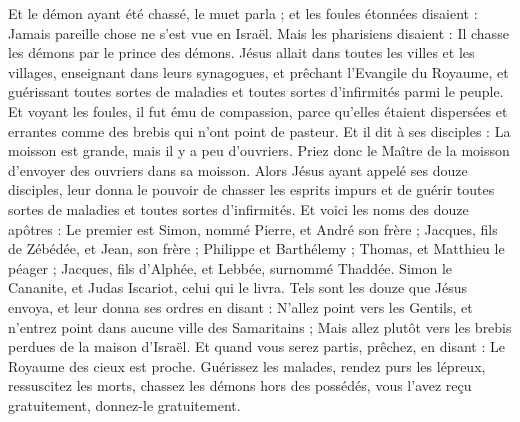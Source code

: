 \begin{multicols}{2}
Et le démon ayant été chassé, le muet parla ; et les foules étonnées disaient : Jamais pareille chose ne s’est vue en Israël.
Mais les pharisiens disaient : Il chasse les démons par le prince des démons.
Jésus allait dans toutes les villes et les villages, enseignant dans leurs synagogues, et prêchant l'Evangile du Royaume, et guérissant toutes sortes de maladies et toutes sortes d'infirmités parmi le peuple.
Et voyant les foules, il fut ému de compassion, parce qu'elles étaient dispersées et errantes comme des brebis qui n'ont point de pasteur.
Et il dit à ses disciples : La moisson est grande, mais il y a peu d'ouvriers.
Priez donc le Maître de la moisson d’envoyer des ouvriers dans sa moisson.
\VerseOne{}Alors Jésus ayant appelé ses douze disciples, leur donna le pouvoir de chasser les esprits impurs et de guérir toutes sortes de maladies et toutes sortes d'infirmités.
Et voici les noms des douze apôtres : Le premier est Simon, nommé Pierre, et André son frère ; Jacques, fils de Zébédée, et Jean, son frère ;
Philippe et Barthélemy ; Thomas, et Matthieu le péager ; Jacques, fils d'Alphée, et Lebbée, surnommé Thaddée.
Simon le Cananite, et Judas Iscariot, celui qui le livra.
Tels sont les douze que Jésus envoya, et leur donna ses ordres en disant : N'allez point vers les Gentils, et n'entrez point dans aucune ville des Samaritains ;
Mais allez plutôt vers les brebis perdues de la maison d'Israël.
Et quand vous serez partis, prêchez, en disant : Le Royaume des cieux est proche.
Guérissez les malades, rendez purs les lépreux, ressuscitez les morts, chassez les démons hors des possédés, vous l’avez reçu gratuitement, donnez-le gratuitement.

\end{multicols}
